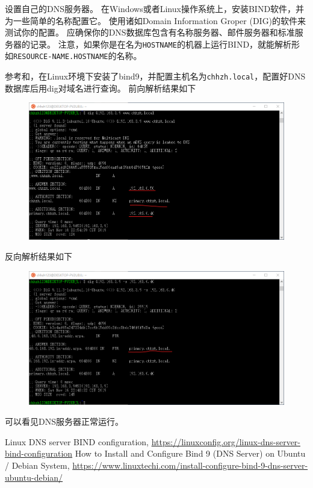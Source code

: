 \documentclass[logo,reportComp]{thesis}
\begin{document}
\begin{question}
设置自己的DNS服务器。
在Windows或者Linux操作系统上，安装BIND软件，并为一些简单的名称配置它。
使用诸如Domain Information Groper (DIG)的软件来测试你的配置。
应确保你的DNS数据库包含有名称服务器、邮件服务器和标准服务器的记录。
注意，如果你是在名为\verb'HOSTNAME'的机器上运行BIND，就能解析形如\verb'RESOURCE-NAME.HOSTNAME'的名称。
\end{question}
\begin{answer}
参考\cite{bib1}和\cite{bib2}，在Linux环境下安装了bind9，并配置主机名为\verb'chhzh.local'，配置好DNS数据库后用dig对域名进行查询。
前向解析结果如下
\begin{figure}[H]
\centering
\includegraphics[width=\linewidth]{fig/forward.png}
\end{figure}
反向解析结果如下
\begin{figure}[H]
\centering
\includegraphics[width=\linewidth]{fig/reverse.png}
\end{figure}
可以看见DNS服务器正常运行。
\end{answer}

\begin{thebibliography}{99}
 Linux DNS server BIND configuration, \url{https://linuxconfig.org/linux-dns-server-bind-configuration}
 How to Install and Configure Bind 9 (DNS Server) on Ubuntu / Debian System, \url{https://www.linuxtechi.com/install-configure-bind-9-dns-server-ubuntu-debian/}
\end{thebibliography}
\end{document}
